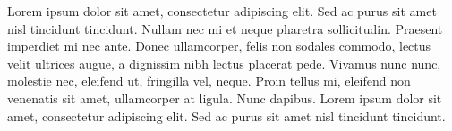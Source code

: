 \documentclass[a4paper]{article}
\begin{document}
\noindent
Lorem ipsum dolor sit amet, consectetur adipiscing elit. Sed ac purus sit amet
nisl tincidunt tincidunt. Nullam nec mi et neque pharetra sollicitudin. Praesent
imperdiet mi nec ante. Donec ullamcorper, felis non sodales commodo, lectus velit
ultrices augue, a dignissim nibh lectus placerat pede. Vivamus nunc nunc, molestie
nec, eleifend ut, fringilla vel, neque. Proin tellus mi, eleifend non venenatis
sit amet, ullamcorper at ligula. Nunc dapibus. Lorem ipsum dolor sit amet,
consectetur adipiscing elit. Sed ac purus sit amet nisl tincidunt tincidunt.
\end{document}
